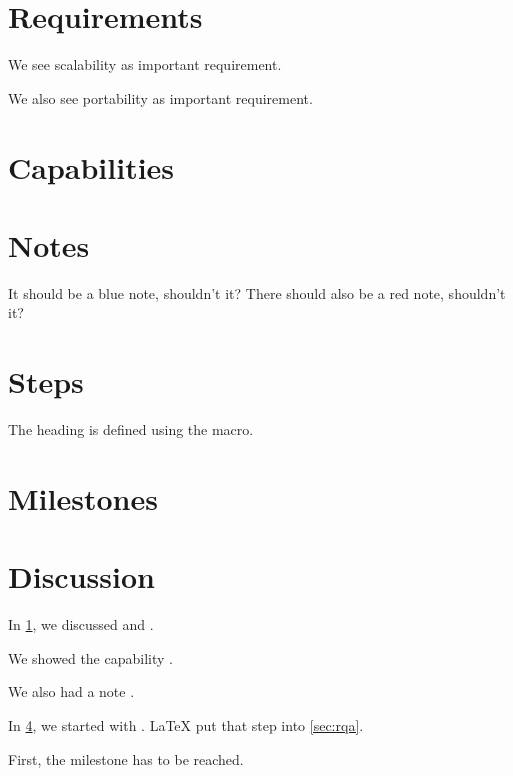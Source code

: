 \documentclass{article}
\begin{document}
\tableofcontents
\clearpage







\section{Requirements}
\label{secreqs}
We see scalability as important requirement.

We also see portability as important requirement.


\section{Capabilities}

\section{Notes}
 It should be a blue note, shouldn't it?
 There should also be a red note, shouldn't it?

\section{Steps}
\label{sec:steps}

\label{sec:rqa}
The heading is defined using the macro.

\section{Milestones}

\clearpage


\section{Discussion}
In \cref{secreqs}, we discussed  and .

We showed the capability .

We also had a note .

In \cref{sec:steps}, we started with .
\LaTeX{} put that step into \cref{sec:rqa}.

First, the milestone  has to be reached.
\end{document}

